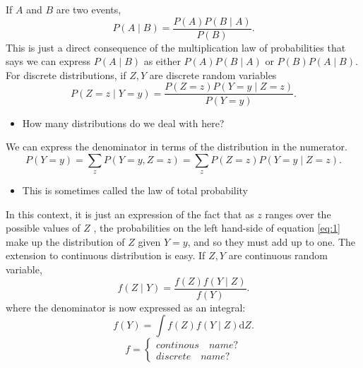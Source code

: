 \documentclass[lecture,12pt,]{pcms-l}
\numberwithin{section}{chapter}
\numberwithin{equation}{chapter}
\theoremstyle{plain}
\theoremstyle{definition}
\theoremstyle{definition}
\begin{document}
If $A$ and $B$ are two events,
\begin{equation}
P(A\mid B)=\frac{P(A)P(B\mid A)}{P(B)}.
\end{equation}
This is just a direct consequence of the multiplication law of probabilities that says we can express $P(A\mid B)$ as either $P(A)P(B\mid A)$ or $P(B)P(A\mid B)$. For discrete distributions, if $Z,Y$ are discrete random variables
\begin{equation}
\label{eq:1}
P(Z=z\mid Y = y)=\frac{P(Z =z)P(Y = y\mid Z =z)}{P(Y = y)}.
\end{equation}
\begin{itemize}
\item How many distributions do we deal with here?
\end{itemize}
We can express the denominator in terms of the distribution in the numerator\cite{Allen}.
\begin{equation}
P(Y = y)=\sum_z P(Y = y, Z =z)=\sum_z P(Z= z)P(Y = y\mid Z =z).
\end{equation}
\begin{itemize}
\item This is sometimes called the law of total probability 
\end{itemize}
In this context, it is just an expression of the fact that as $z$ ranges over the possible values of $Z$
, the probabilities on the left hand-side of equation \ref{eq:1} make up the distribution of $Z$ given $Y=y$, and so they must add up to one. The extension to continuous distribution is easy. If $Z,Y$ are continuous random variable,
\begin{equation}
f(Z\mid Y)=\frac{f(Z)f(Y\mid Z)}{f(Y)}.
\end{equation}
where the denominator is now expressed as an integral:
\begin{equation}
f(Y)=\int f(Z)f(Y\mid Z)\mathrm{d}Z.
\end{equation}
\begin{equation}
f=
\left\{\begin{matrix}
continous \quad name ?\\ 
discrete \quad name ?
\end{matrix}\right.
\end{equation}


\vfill
\eject
\end{document}
